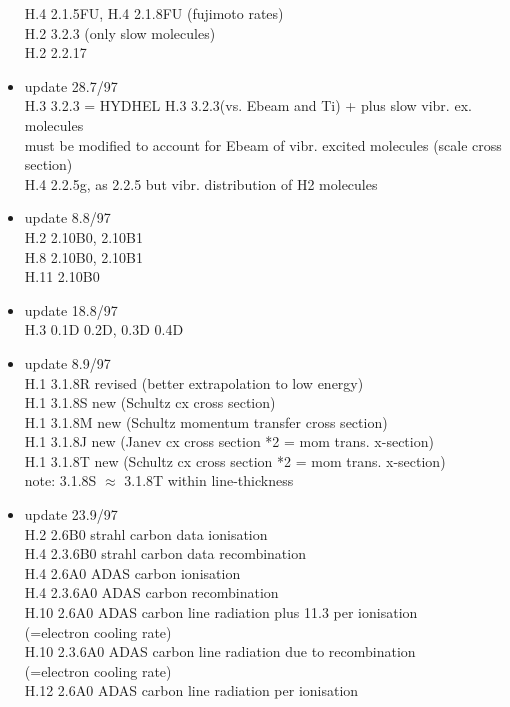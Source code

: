 \begin{itemize}
  H.4 2.1.5FU, H.4 2.1.8FU (fujimoto rates) \\
  H.2 3.2.3  (only slow molecules) \\
  H.2 2.2.17
 \item update   28.7/97 \\
  H.3 3.2.3  = HYDHEL H.3 3.2.3(vs. Ebeam and Ti) + plus
  slow vibr. ex. molecules\\
  must be modified to account for Ebeam of vibr. excited
  molecules (scale cross section)\\
  H.4 2.2.5g, as 2.2.5 but vibr. distribution of H2 molecules
 \item update    8.8/97 \\
  H.2 2.10B0, 2.10B1 \\
  H.8 2.10B0, 2.10B1 \\
  H.11 2.10B0
 \item update   18.8/97 \\
  H.3 0.1D  0.2D, 0.3D 0.4D \\
 \item update    8.9/97 \\
  H.1 3.1.8R revised (better extrapolation to low energy) \\
  H.1 3.1.8S new (Schultz cx cross section) \\
  H.1 3.1.8M new (Schultz momentum transfer cross section) \\
  H.1 3.1.8J new (Janev cx cross section *2 = mom trans. x-section)\\
  H.1 3.1.8T new (Schultz cx cross section *2 = mom trans. x-section)\\
  note: 3.1.8S $\approx$ 3.1.8T within line-thickness
 \item update   23.9/97 \\
  H.2 2.6B0 strahl carbon data ionisation\\
  H.4 2.3.6B0 strahl carbon data recombination \\
  H.4 2.6A0 ADAS  carbon ionisation    \\
  H.4 2.3.6A0 ADAS  carbon recombination \\
  H.10 2.6A0 ADAS  carbon line radiation plus 11.3 per ionisation\\
                   (=electron cooling rate)\\
  H.10 2.3.6A0 ADAS  carbon line radiation due to recombination\\
                   (=electron cooling rate)\\
  H.12 2.6A0 ADAS  carbon line radiation per ionisation\\

\end{itemize}
